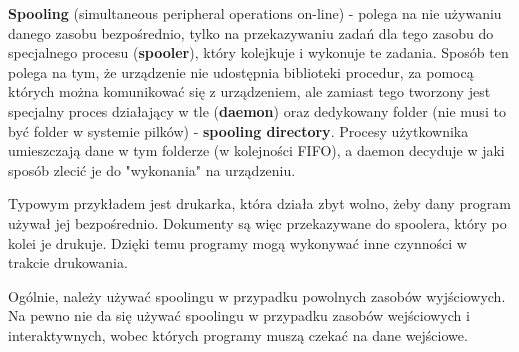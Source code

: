 \textbf{Spooling} (simultaneous peripheral operations on-line) - polega na nie używaniu danego zasobu bezpośrednio, tylko na przekazywaniu zadań dla tego zasobu do specjalnego procesu (\textbf{spooler}), który kolejkuje i wykonuje te zadania. Sposób ten polega na tym, że urządzenie nie udostępnia biblioteki procedur, za pomocą których można komunikować się z urządzeniem, ale zamiast tego tworzony jest specjalny proces działający w tle (\textbf{daemon}) oraz dedykowany folder (nie musi to być folder w systemie pilków) - \textbf{spooling directory}. Procesy użytkownika umieszczają dane w tym folderze (w kolejności FIFO), a daemon decyduje w jaki sposób zlecić je do "wykonania" na urządzeniu.

Typowym przykładem jest drukarka, która działa zbyt wolno, żeby dany program używał jej bezpośrednio. Dokumenty są więc przekazywane do spoolera, który po kolei je drukuje. Dzięki temu programy mogą wykonywać inne czynności w trakcie drukowania.

Ogólnie, należy używać spoolingu w przypadku powolnych zasobów wyjściowych. Na pewno nie da się używać spoolingu w przypadku zasobów wejściowych i interaktywnych, wobec których programy muszą czekać na dane wejściowe.